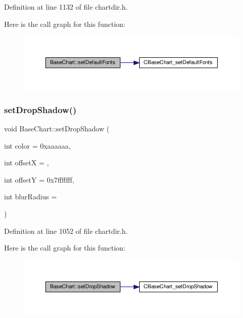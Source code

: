 Definition at line 1132 of file chartdir.\+h.

Here is the call graph for this function\+:
\nopagebreak
\begin{figure}[H]
\begin{center}
\leavevmode
\includegraphics[width=350pt]{class_base_chart_a972253c28223ba0f9811657fa783a674_cgraph}
\end{center}
\end{figure}
\mbox{\label{class_base_chart_a4b124130d9ced71df335c970a716dde9}} 
\subsubsection{\texorpdfstring{set\+Drop\+Shadow()}{setDropShadow()}}
{\footnotesize\ttfamily void Base\+Chart\+::set\+Drop\+Shadow (\begin{DoxyParamCaption}\item[{int}]{color = {\ttfamily 0xaaaaaa},  }\item[{int}]{offsetX = {},  }\item[{int}]{offsetY = {\ttfamily 0x7fffffff},  }\item[{int}]{blur\+Radius = {} }\end{DoxyParamCaption})\hspace{0.3cm}{\ttfamily [inline]}}



Definition at line 1052 of file chartdir.\+h.

Here is the call graph for this function\+:
\nopagebreak
\begin{figure}[H]
\begin{center}
\leavevmode
\includegraphics[width=350pt]{class_base_chart_a4b124130d9ced71df335c970a716dde9_cgraph}
\end{center}
\end{figure}
\mbox{\label{class_base_chart_ad0c87a37505dbfcac5a20286053552e5}} 
